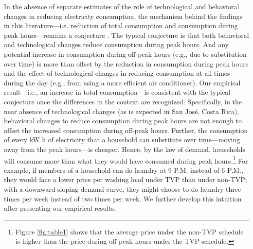 \documentclass[12pt]{article}
\begin{document}
\sloppy In the absence of separate estimates of the role of technological and behavioral changes in reducing electricity consumption, the mechanism behind the findings in this literature---i.e.  reduction of total consumption and consumption during peak hours---remains a conjecture \citep{allcottRethinkingRealtimeElectricity2011,jessoeUnderstandingRolePrice2014}. The typical conjecture is that both behavioral and technological changes reduce consumption during peak hours. And any potential increase in consumption during off-peak hours (e.g., due to substitution over time) is more than offset by the reduction in consumption during peak hours and the effect of technological changes in reducing consumption at all times during the day (e.g., from using a more efficient air conditioner). Our empirical result---i.e., an increase in total consumption---is consistent with the typical conjecture once the differences in the context are recognized. Specifically, in the near absence of technological changes (as is expected in San José, Costa Rica), behavioral changes to reduce consumption during peak hours are not enough to offset the increased consumption during off-peak hours. Further, the consumption of every kW h of electricity that a household can substitute over time---moving away from the peak hours---is cheaper. Hence, by the law of demand, households will consume more than what they would have consumed during peak hours.\footnote{Figure \ref{fig:table1} shows that the average price under the non-TVP schedule is higher than the price during off-peak hours under the TVP schedule.} For example, if members of a household can do laundry at 9 P.M. instead of 6 P.M., they would face a lower price per washing load under TVP than under non-TVP; with a downward-sloping demand curve, they might choose to do laundry three times per week instead of two times per week. We further develop this intuition after presenting our empirical results.
\end{document}
